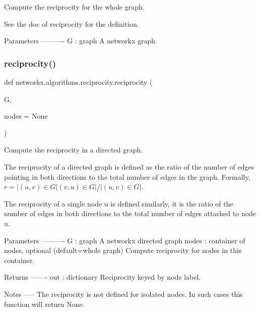 \begin{DoxyVerb}Compute the reciprocity for the whole graph.

See the doc of reciprocity for the definition.

Parameters
----------
G : graph
   A networkx graph\end{DoxyVerb}
 \mbox{\label{namespacenetworkx_1_1algorithms_1_1reciprocity_ad9c5eb2c7c95917ff11d3a87624d7fee}} 
\subsubsection{\texorpdfstring{reciprocity()}{reciprocity()}}
{\footnotesize\ttfamily def networkx.\+algorithms.\+reciprocity.\+reciprocity (\begin{DoxyParamCaption}\item[{}]{G,  }\item[{}]{nodes = {\ttfamily None} }\end{DoxyParamCaption})}

\begin{DoxyVerb}Compute the reciprocity in a directed graph.

The reciprocity of a directed graph is defined as the ratio
of the number of edges pointing in both directions to the total
number of edges in the graph.
Formally, $r = |{(u,v) \in G|(v,u) \in G}| / |{(u,v) \in G}|$.

The reciprocity of a single node u is defined similarly,
it is the ratio of the number of edges in both directions to
the total number of edges attached to node u.

Parameters
----------
G : graph
   A networkx directed graph
nodes : container of nodes, optional (default=whole graph)
   Compute reciprocity for nodes in this container.

Returns
-------
out : dictionary
   Reciprocity keyed by node label.

Notes
-----
The reciprocity is not defined for isolated nodes.
In such cases this function will return None.\end{DoxyVerb}
 